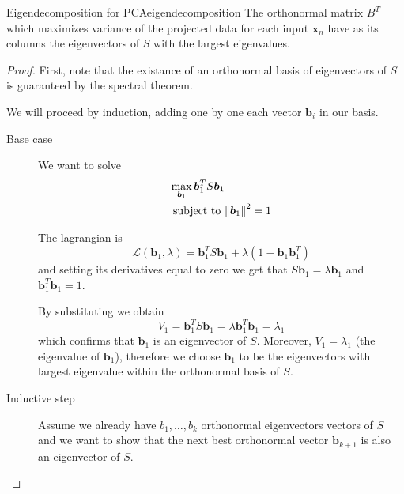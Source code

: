 \documentclass[12pt]{extarticle}
\renewcommand{\vec}[1]{\bm{#1}}
\begin{document}
\begin{theorem}{Eigendecomposition for PCA}{eigendecomposition}
	The orthonormal matrix $B^T$ which maximizes variance of the projected data
	for each input $\vec x_n$	have as its columns the eigenvectors of $S$
	with the largest eigenvalues.
\end{theorem}

\begin{proof}
	First, note that the existance of an orthonormal basis of eigenvectors of $S$ is guaranteed by
	the spectral theorem.

	We will proceed by induction, adding one by one each vector $\vec b_i$ in our basis.
		{
			\begin{description}
				\item[Base case]
				      We want to solve
				      \begin{align}
					      \max_{\vec b_1} \vec b_1^T S \vec b_1 &                       \\
					      \text{subject to }                    & \norm{\vec b_1}^2 = 1
				      \end{align}

				      The lagrangian is
				      \begin{equation}
					      \mathcal L(\vec b_1, \lambda) = \vec b_1^T S \vec b_1 + \lambda(1-\vec b_1 \vec b_1^T)
				      \end{equation}
				      and setting its derivatives equal to zero we get that $S \vec b_1 = \lambda \vec b_1$
				      and $\vec b_1^T \vec b_1 = 1$.

				      By substituting we obtain
				      \begin{equation}
					      V_1 = \vec b_1^T S \vec b_1 = \lambda \vec b_1^T \vec b_1 = \lambda_1
				      \end{equation}
				      which confirms that $\vec b_1$ is an eigenvector of $S$.
				      Moreover, $V_1 = \lambda_1$ (the eigenvalue of $\vec b_1$), therefore we choose
				      $\vec b_1$ to be the eigenvectors with largest eigenvalue within the orthonormal basis
				      of $S$.

				\item[Inductive step] Assume we already have $b_1, \dots, b_k$ orthonormal eigenvectors
				      vectors of $S$ and we want to show that the next best orthonormal vector
				      $\vec b_{k+1}$ is also an eigenvector of $S$.


\end{description}}
\end{proof}
\end{document}
